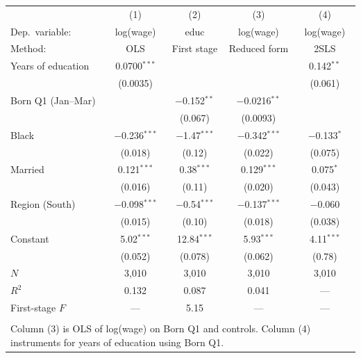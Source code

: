 \documentclass[11pt]{article}
\begin{document}
\begin{center}
{\setlength{\tabcolsep}{6pt}\renewcommand{\arraystretch}{1.05}
\begin{tabular}{lcccc}
\toprule
                   & (1)              & (2)               & (3)               & (4) \\
Dep.\ variable:    & log(wage)        & educ              & log(wage)         & log(wage) \\
Method:            & OLS              & First stage       & Reduced form      & 2SLS \\
\midrule
Years of education & 0.0700$^{***}$   &                   &                   & 0.142$^{**}$ \\
                   & (0.0035)         &                   &                   & (0.061) \\
\addlinespace
Born Q1 (Jan--Mar) &                  & $-$0.152$^{**}$   & $-$0.0216$^{**}$  & \\
                   &                  & (0.067)           & (0.0093)          & \\
\addlinespace
Black              & $-$0.236$^{***}$ & $-$1.47$^{***}$   & $-$0.342$^{***}$  & $-$0.133$^{*}$ \\
                   & (0.018)          & (0.12)            & (0.022)           & (0.075) \\
\addlinespace
Married            & 0.121$^{***}$    & 0.38$^{***}$      & 0.129$^{***}$     & 0.075$^{*}$ \\
                   & (0.016)          & (0.11)            & (0.020)           & (0.043) \\
\addlinespace
Region (South)     & $-$0.098$^{***}$ & $-$0.54$^{***}$   & $-$0.137$^{***}$  & $-$0.060 \\
                   & (0.015)          & (0.10)            & (0.018)           & (0.038) \\
\addlinespace
Constant           & 5.02$^{***}$     & 12.84$^{***}$     & 5.93$^{***}$      & 4.11$^{***}$ \\
                   & (0.052)          & (0.078)           & (0.062)           & (0.78) \\
\midrule
$N$                & 3{,}010          & 3{,}010           & 3{,}010           & 3{,}010 \\
$R^{2}$            & 0.132            & 0.087             & 0.041             & --- \\
First-stage $F$    & ---              & 5.15              & ---               & --- \\
\bottomrule
\addlinespace
\multicolumn{5}{l}{\footnotesize Standard errors in parentheses. $^{*}\,p<0.10$, $^{**}\,p<0.05$, $^{***}\,p<0.01$.} \\
\multicolumn{5}{l}{\footnotesize Column (3) is OLS of log(wage) on Born Q1 and controls. Column (4) instruments for years of education using Born Q1.} \\
\end{tabular}%
}
\end{center}
\end{document}
